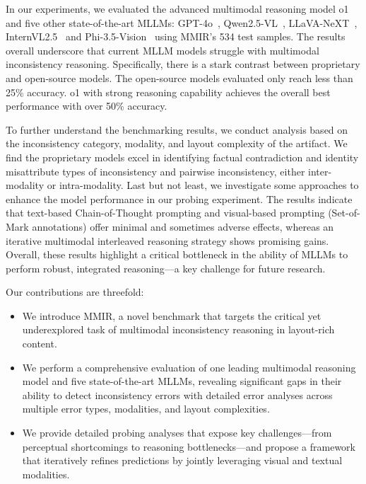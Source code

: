 In our experiments, we evaluated the advanced multimodal reasoning model o1~\cite{openai2024gpto1card} and five other state-of-the-art MLLMs: GPT-4o~\cite{openai2024gpt4ocard}, Qwen2.5-VL~\cite{Qwen2.5-VL}, LLaVA-NeXT~\cite{liu2024llavanext}, InternVL2.5~\cite{Chen2024ExpandingPB} and Phi-3.5-Vision~\cite{abdin2024phi3technicalreporthighly} using MMIR's 534 test samples. %
The results overall underscore that current MLLM models struggle with multimodal inconsistency reasoning. Specifically, there is a stark contrast between proprietary and open-source models. The open-source models evaluated only reach less than 25\% accuracy. o1 with strong reasoning capability achieves the overall best performance with over 50\% accuracy.%

To further understand the benchmarking results, we conduct analysis based on the inconsistency category, modality, and layout complexity of the artifact. We find the proprietary models excel in identifying factual contradiction and identity misattribute types of inconsistency and pairwise inconsistency, either inter-modality or intra-modality.
Last but not least, we investigate some approaches to enhance the model performance in our probing experiment. The results indicate that text-based Chain-of-Thought prompting and visual-based prompting (Set-of-Mark annotations) offer minimal and sometimes adverse effects, whereas an iterative multimodal interleaved reasoning strategy shows promising gains. Overall, these results highlight a critical bottleneck in the ability of MLLMs to perform robust, integrated reasoning—a key challenge for future research.

Our contributions are threefold: 
\begin{itemize} 
\item We introduce MMIR, a novel benchmark that targets the critical yet underexplored task of multimodal inconsistency reasoning in layout-rich content. 
\item We perform a comprehensive evaluation of one leading multimodal reasoning model and five state-of-the-art MLLMs, revealing significant gaps in their ability to detect inconsistency errors with detailed error analyses across multiple error types, modalities, and layout complexities.
\item We provide detailed probing analyses that expose key challenges—from perceptual shortcomings to reasoning bottlenecks—and propose a framework that iteratively refines predictions by jointly leveraging visual and textual modalities.
\end{itemize}